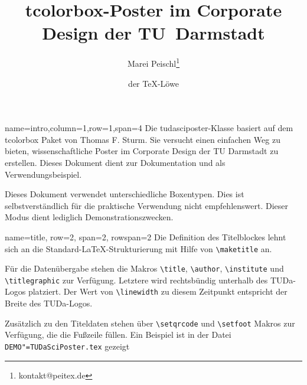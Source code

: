 \documentclass[
	accentcolor=9c,
	]{tudasciposter}
\newcommand{\tbs}{\textbackslash}
\let\code\texttt
\newcommand*{\macro}[1]{\code{\tbs#1}}
\let\file\texttt
\let\pck\textsf
\let\cls\textsf
\begin{document}
\title{\pck{tcolorbox}-Poster im Corporate Design der TU~Darmstadt}
\author{Marei Peischl\inst{*}\thanks{kontakt@peitex.de} \and der \TeX-Löwe}


\begin{tcbposter}[
		poster={
			columns=4,
			rows=7,
			spacing=1cm,
		},]

	\begin{posterboxenv}[title=Zusammenfassung]{name=intro,column=1,row=1,span=4}
		Die \cls{tudasciposter}-Klasse basiert auf dem \pck{tcolorbox} Paket von Thomas F. Sturm.
		Sie versucht einen einfachen Weg zu bieten, wissenschaftliche Poster im Corporate Design der TU Darmstadt zu erstellen. Dieses Dokument dient zur Dokumentation und als Verwendungsbeispiel.

		Dieses Dokument verwendet unterschiedliche Boxentypen. Dies ist selbstverständlich für die praktische Verwendung nicht empfehlenswert. Dieser Modus dient lediglich Demonstrationszwecken.
	\end{posterboxenv}

	\begin{posterboxenv}[title=Titelei]{name=title, row=2, span=2, rowspan=2}
		Die Definition des Titelblockes lehnt sich an die Standard-\LaTeX{}-Strukturierung  mit Hilfe von \macro{maketitle} an.

		Für die Datenübergabe stehen die Makros \macro{title}, \macro{author}, \macro{institute} und \macro{titlegraphic} zur Verfügung. Letztere wird rechtsbündig  unterhalb des TUDa-Logos platziert. Der Wert von \macro{linewidth} zu diesem Zeitpunkt entspricht der Breite des TUDa-Logos.

		Zusätzlich zu den Titeldaten stehen über \macro{setqrcode} und \macro{setfoot} Makros zur Verfügung, die die Fußzeile füllen.
		Ein Beispiel ist in der Datei \file{DEMO"=TUDaSciPoster.tex} gezeigt
	\end{posterboxenv}


\end{tcbposter}
\end{document}
